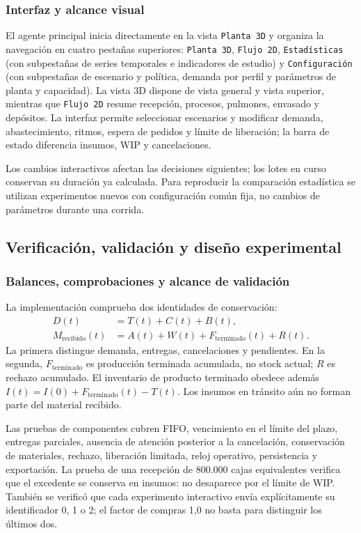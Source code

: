 \documentclass[11pt, a4paper]{article}
\begin{document}
\subsubsection{Interfaz y alcance visual}
El agente principal inicia directamente en la vista \texttt{Planta 3D} y organiza la navegación en cuatro pestañas superiores: \texttt{Planta 3D}, \texttt{Flujo 2D}, \texttt{Estadísticas} (con subpestañas de series temporales e indicadores de estudio) y \texttt{Configuración} (con subpestañas de escenario y política, demanda por perfil y parámetros de planta y capacidad). La vista 3D dispone de vista general y vista superior, mientras que \texttt{Flujo 2D} resume recepción, procesos, pulmones, envasado y depósitos. La interfaz permite seleccionar escenarios y modificar demanda, abastecimiento, ritmos, espera de pedidos y límite de liberación; la barra de estado diferencia insumos, WIP y cancelaciones.

Los cambios interactivos afectan las decisiones siguientes; los lotes en curso conservan su duración ya calculada. Para reproducir la comparación estadística se utilizan experimentos nuevos con configuración común fija, no cambios de parámetros durante una corrida.

\subsection{Verificación, validación y diseño experimental}
\subsubsection{Balances, comprobaciones y alcance de validación}
La implementación comprueba dos identidades de conservación:
\begin{align}
    D(t)&=T(t)+C(t)+B(t),\\
    M_{\text{recibido}}(t)&=A(t)+W(t)+F_{\text{terminado}}(t)+R(t).
\end{align}
La primera distingue demanda, entregas, cancelaciones y pendientes. En la segunda, $F_{\text{terminado}}$ es producción terminada acumulada, no stock actual; $R$ es rechazo acumulado. El inventario de producto terminado obedece además $I(t)=I(0)+F_{\text{terminado}}(t)-T(t)$. Los insumos en tránsito aún no forman parte del material recibido.

Las pruebas de componentes cubren FIFO, vencimiento en el límite del plazo, entregas parciales, ausencia de atención posterior a la cancelación, conservación de materiales, rechazo, liberación limitada, reloj operativo, persistencia y exportación. La prueba de una recepción de 800.000 cajas equivalentes verifica que el excedente se conserva en insumos: no desaparece por el límite de WIP. También se verificó que cada experimento interactivo envía explícitamente su identificador 0, 1 o 2; el factor de compras 1,0 no basta para distinguir los últimos dos.
\end{document}
